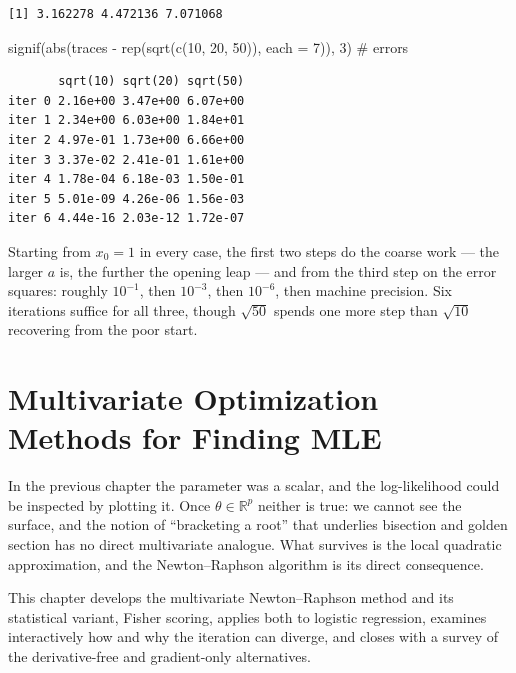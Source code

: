 \documentclass[
  letterpaper,
  DIV=11,
  numbers=noendperiod]{scrreprt}
\newenvironment{Shaded}{\begin{snugshade}}{\end{snugshade}}
\newcommand{\AttributeTok}[1]{\textcolor[rgb]{0.40,0.45,0.13}{#1}}
\newcommand{\CommentTok}[1]{\textcolor[rgb]{0.37,0.37,0.37}{#1}}
\newcommand{\DecValTok}[1]{\textcolor[rgb]{0.68,0.00,0.00}{#1}}
\newcommand{\FunctionTok}[1]{\textcolor[rgb]{0.28,0.35,0.67}{#1}}
\newcommand{\NormalTok}[1]{\textcolor[rgb]{0.00,0.23,0.31}{#1}}
\newcommand{\SpecialCharTok}[1]{\textcolor[rgb]{0.37,0.37,0.37}{#1}}
\begin{document}
\begin{verbatim}
[1] 3.162278 4.472136 7.071068
\end{verbatim}

\begin{Shaded}
\begin{Highlighting}[]
\FunctionTok{signif}\NormalTok{(}\FunctionTok{abs}\NormalTok{(traces }\SpecialCharTok{{-}} \FunctionTok{rep}\NormalTok{(}\FunctionTok{sqrt}\NormalTok{(}\FunctionTok{c}\NormalTok{(}\DecValTok{10}\NormalTok{, }\DecValTok{20}\NormalTok{, }\DecValTok{50}\NormalTok{)), }\AttributeTok{each =} \DecValTok{7}\NormalTok{)), }\DecValTok{3}\NormalTok{)    }\CommentTok{\# errors}
\end{Highlighting}
\end{Shaded}

\begin{verbatim}
       sqrt(10) sqrt(20) sqrt(50)
iter 0 2.16e+00 3.47e+00 6.07e+00
iter 1 2.34e+00 6.03e+00 1.84e+01
iter 2 4.97e-01 1.73e+00 6.66e+00
iter 3 3.37e-02 2.41e-01 1.61e+00
iter 4 1.78e-04 6.18e-03 1.50e-01
iter 5 5.01e-09 4.26e-06 1.56e-03
iter 6 4.44e-16 2.03e-12 1.72e-07
\end{verbatim}

Starting from \(x_0 = 1\) in every case, the first two steps do the
coarse work --- the larger \(a\) is, the further the opening leap ---
and from the third step on the error squares: roughly \(10^{-1}\), then
\(10^{-3}\), then \(10^{-6}\), then machine precision. Six iterations
suffice for all three, though \(\sqrt{50}\) spends one more step than
\(\sqrt{10}\) recovering from the poor start.


\chapter{Multivariate Optimization Methods for Finding
MLE}\label{multivariate-optimization-methods-for-finding-mle}

In the previous chapter the parameter was a scalar, and the
log-likelihood could be inspected by plotting it. Once
\(\theta \in \mathbb{R}^p\) neither is true: we cannot see the surface,
and the notion of ``bracketing a root'' that underlies bisection and
golden section has no direct multivariate analogue. What survives is the
local quadratic approximation, and the Newton--Raphson algorithm is its
direct consequence.

This chapter develops the multivariate Newton--Raphson method and its
statistical variant, Fisher scoring, applies both to logistic
regression, examines interactively how and why the iteration can
diverge, and closes with a survey of the derivative-free and
gradient-only alternatives.
\end{document}
